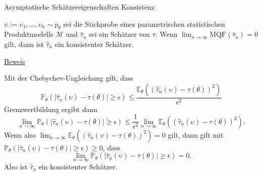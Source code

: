 \documentclass[
  8pt,
  ignorenonframetext,
]{beamer}
\newcommand{\ups} {\upsilon}
\begin{document}
\begin{frame}{\small Asymptotische Schätzereigenschaften \textbar{}
Konsistenz}
\protect\hypertarget{asymptotische-schuxe4tzereigenschaften-konsistenz-1}{}
\small
\begin{theorem}
\normalfont
\justifying
$\ups := \ups_1,...,\ups_n \sim p_\theta$ sei die Stichprobe eines parametrischen statistischen
Produktmodells $\mathcal{M}$ und $\hat{\tau}_n$ sei ein Schätzer von $\tau$. Wenn
$\lim_{n\to \infty} \mbox{MQF}(\hat{\tau}_n) = 0$ gilt, dann ist $\hat{\tau}_n$
ein konsistenter Schätzer.
\end{theorem}

\footnotesize

\underline{Beweis}

Mit der Chebychev-Ungleichung gilt, dass \begin{equation}
\mathbb{P}_\theta\left(|\hat{\tau}_n(\ups) - \tau(\theta)| \ge \epsilon \right) \le
\frac{\mathbb{E}_\theta\left((\hat{\tau}_n(\ups) -  \tau(\theta))^2\right)}{\epsilon^2}
\end{equation} Grenzwertbildung ergibt dann \begin{equation}
\lim_{n\to \infty}\mathbb{P}_\theta\left(|\hat{\tau}_n(\ups) - \tau(\theta)| \ge \epsilon \right) \le
\frac{1}{\epsilon^2}\lim_{n\to\infty}\mathbb{E}_\theta\left((\hat{\tau}_n(\ups) - \tau(\theta))^2\right).
\end{equation} Wenn also
\(\lim_{n\to\infty}\mathbb{E}_\theta\left((\hat{\tau}_n(\ups) - \tau(\theta))^2\right) = 0\)
gilt, dann gilt mit
\(\mathbb{P}_\theta(|\hat{\tau}_n(\ups) - \tau(\theta)| \ge \epsilon)\ge 0\),
dass \begin{equation}
\lim_{n\to \infty}\mathbb{P}_\theta\left(|\hat{\tau}_n(\ups) - \tau(\theta)| \ge \epsilon \right) = 0.
\end{equation} Also ist \(\hat{\tau}_n\) ein konsistenter Schätzer.
\end{frame}
\end{document}
